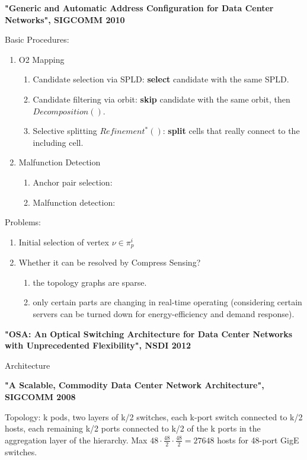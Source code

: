 \documentclass[journal,onecolumn,11pt]{IEEEtran}
\begin{document}
\textbf{"Generic and Automatic Address Configuration for Data Center Networks", SIGCOMM 2010}

Basic Procedures:\cite{Chen:2010:GAA:1851182.1851190}
\begin{enumerate}
  \item O2 Mapping
  \begin{enumerate}
    \item Candidate selection via SPLD: \textbf{select} candidate with the same SPLD.
    \item Candidate filtering via orbit: \textbf{skip} candidate with the same orbit, then $Decomposition()$.
    \item Selective splitting $Refinement^*()$: \textbf{split} cells that really connect to the including cell.
  \end{enumerate}
  \item Malfunction Detection
  \begin{enumerate}
    \item Anchor pair selection:
    \item Malfunction detection:
  \end{enumerate}
\end{enumerate}

Problems:
\begin{enumerate}
  \item Initial selection of vertex $\nu\in\pi_p^i$
  \item Whether it can be resolved by Compress Sensing?
  \begin{enumerate}
    \item the topology graphs are sparse.
    \item only certain parts are changing in real-time operating (considering certain servers can be turned down for energy-efficiency and demand response).
  \end{enumerate}
\end{enumerate}

\textbf{"OSA: An Optical Switching Architecture for Data Center Networks with Unprecedented Flexibility", NSDI 2012}

Architecture

\textbf{"A Scalable, Commodity Data Center Network Architecture", SIGCOMM 2008}

Topology: k pods, two layers of k/2 switches, each k-port switch connected to k/2 hosts, each remaining k/2 ports connected to k/2 of the k ports in the aggregation layer of the hierarchy. Max $48\cdot \frac{48}{2} \cdot \frac{48}{2}=27648$ hosts for 48-port GigE switches.
\end{document}
